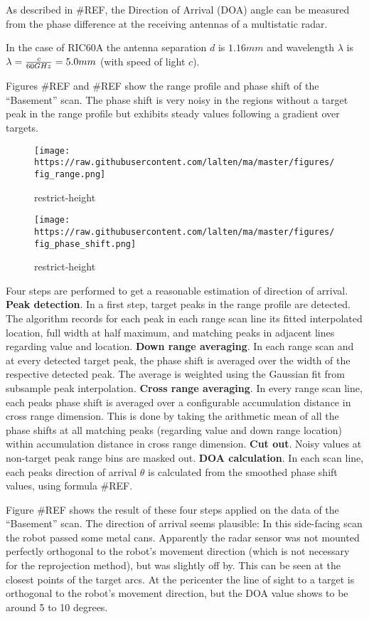 As described in \#REF, the Direction of Arrival (DOA) angle can be
measured from the phase difference at the receiving antennas of a
multistatic radar.

In the case of RIC60A the antenna separation \(d\) is \(1.16mm\) and
wavelength \(\lambda\) is \(\lambda={c\over{60GHz}}=5.0mm\) (with speed
of light \(c\)).

Figures \#REF and \#REF show the range profile and phase shift of the
``Basement'' scan. The phase shift is very noisy in the regions without
a target peak in the range profile but exhibits steady values following
a gradient over targets.

\begin{figure}
\centering
\texttt{[image: https://raw.githubusercontent.com/lalten/ma/master/figures/fig\_range.png]}
\caption{restrict-height}
\end{figure}

\begin{figure}
\centering
\texttt{[image: https://raw.githubusercontent.com/lalten/ma/master/figures/fig\_phase\_shift.png]}
\caption{restrict-height}
\end{figure}

Four steps are performed to get a reasonable estimation of direction of
arrival. \textbf{Peak detection}. In a first step, target peaks in the
range profile are detected. The algorithm records for each peak in each
range scan line its fitted interpolated location, full width at half
maximum, and matching peaks in adjacent lines regarding value and
location. \textbf{Down range averaging}. In each range scan and at every
detected target peak, the phase shift is averaged over the width of the
respective detected peak. The average is weighted using the Gaussian fit
from subsample peak interpolation. \textbf{Cross range averaging}. In
every range scan line, each peaks phase shift is averaged over a
configurable accumulation distance in cross range dimension. This is
done by taking the arithmetic mean of all the phase shifts at all
matching peaks (regarding value and down range location) within
accumulation distance in cross range dimension. \textbf{Cut out}. Noisy
values at non-target peak range bins are masked out. \textbf{DOA
calculation}. In each scan line, each peaks direction of arrival
\(\theta\) is calculated from the smoothed phase shift values, using
formula \#REF.

Figure \#REF shows the result of these four steps applied on the data of
the ``Basement'' scan. The direction of arrival seems plausible: In this
side-facing scan the robot passed some metal cans. Apparently the radar
sensor was not mounted perfectly orthogonal to the robot's movement
direction (which is not necessary for the reprojection method), but was
slightly off by. This can be seen at the closest points of the target
arcs. At the pericenter the line of sight to a target is orthogonal to
the robot's movement direction, but the DOA value shows to be around 5
to 10 degrees.

